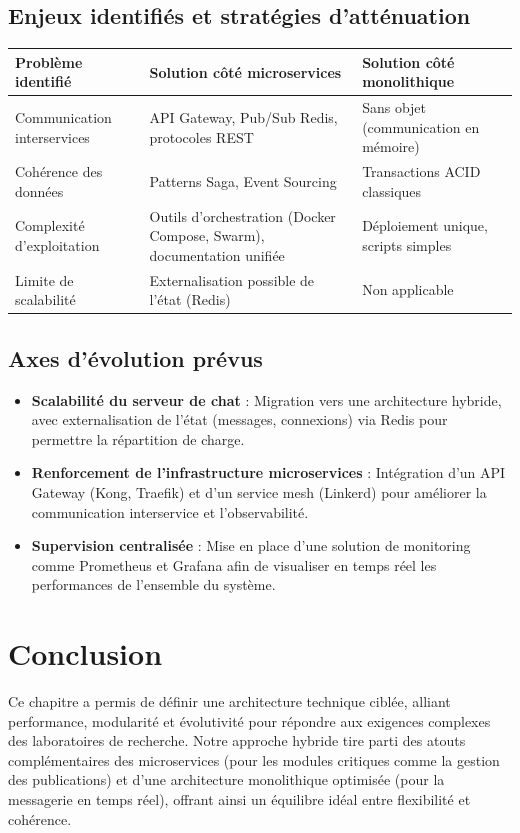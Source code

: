 \documentclass{rapportPfe}
\begin{document}
\subsection{Enjeux identifiés et stratégies d’atténuation}

\begin{center}
\begin{tabular}{|p{4.5cm}|p{5cm}|p{5cm}|}
\hline
\textbf{Problème identifié} & \textbf{Solution côté microservices} & \textbf{Solution côté monolithique} \\
\hline
Communication interservices & API Gateway, Pub/Sub Redis, protocoles REST & Sans objet (communication en mémoire) \\
\hline
Cohérence des données & Patterns Saga, Event Sourcing & Transactions ACID classiques \\
\hline
Complexité d’exploitation & Outils d’orchestration (Docker Compose, Swarm), documentation unifiée & Déploiement unique, scripts simples \\
\hline
Limite de scalabilité & Externalisation possible de l’état (Redis) & Non applicable \\
\hline
\end{tabular}
\end{center}

\newpage

\subsection{Axes d’évolution prévus}

\begin{itemize}
    \item \textbf{Scalabilité du serveur de chat} : Migration vers une architecture hybride, avec externalisation de l’état (messages, connexions) via Redis pour permettre la répartition de charge.
    
    \item \textbf{Renforcement de l'infrastructure microservices} : Intégration d’un API Gateway (Kong, Traefik) et d’un service mesh (Linkerd) pour améliorer la communication interservice et l'observabilité.
    
    \item \textbf{Supervision centralisée} : Mise en place d’une solution de monitoring comme Prometheus et Grafana afin de visualiser en temps réel les performances de l’ensemble du système.
\end{itemize}

\section{Conclusion}
Ce chapitre a permis de définir une architecture technique ciblée, alliant performance, modularité et évolutivité pour répondre aux exigences complexes des laboratoires de recherche. Notre approche hybride tire parti des atouts complémentaires des microservices (pour les modules critiques comme la gestion des publications) et d'une architecture monolithique optimisée (pour la messagerie en temps réel), offrant ainsi un équilibre idéal entre flexibilité et cohérence.
\end{document}
